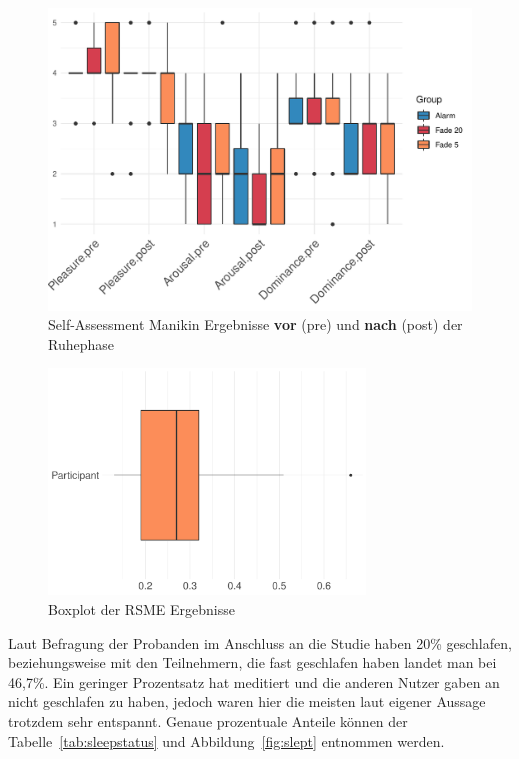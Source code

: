 \begin{figure}[H]
	\centering
	\includegraphics[width=\textwidth]{./_StudyResults/SAMresults}
	\caption{Self-Assessment Manikin Ergebnisse \textbf{vor} (pre) und \textbf{nach} (post) der Ruhephase}
	\label{fig:samResults}
\end{figure}


\begin{figure}[H]
	\centering
	\includegraphics[width=0.75\textwidth]{./_StudyResults/rsme}
	\caption{Boxplot der RSME Ergebnisse}
	\label{fig:rsme_vis}
\end{figure}

Laut Befragung der Probanden im Anschluss an die Studie haben 20\% geschlafen, beziehungsweise mit den Teilnehmern, die fast geschlafen haben landet man bei 46,7\%. Ein geringer Prozentsatz hat meditiert und die anderen Nutzer gaben an nicht geschlafen zu haben, jedoch waren hier die meisten laut eigener Aussage trotzdem sehr entspannt. Genaue prozentuale Anteile können der Tabelle~\ref{tab:sleepstatus} und Abbildung~\ref{fig:slept} entnommen werden.

